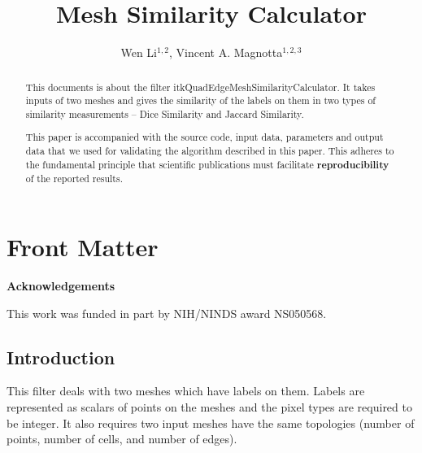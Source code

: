 \documentclass{InsightArticle}
\title{Mesh Similarity Calculator}
\author{Wen Li$^{1,2}$, Vincent A. Magnotta$^{1,2,3}$}
\makeatletter
\newcommand\ackname{Acknowledgements}
\newenvironment{acknowledgements}{%
      \titlepage
      \null\vfil
      \@beginparpenalty\@lowpenalty
      \begin{center}%
        \bfseries \ackname
        \@endparpenalty\@M
      \end{center}}%
     {\par\vfil\null\endtitlepage}
\newenvironment{acknowledgements}{%
      \if@twocolumn
        \section*{\abstractname}%
      \else
        \small
        \begin{center}%
          {\bfseries \ackname\vspace{-.5em}\vspace{\z@}}%
        \end{center}%
        \quotation
      \fi}
      {\if@twocolumn\else\endquotation\fi}
\newcommand{\IJhandlerIDnumber}{3117}
\makeatother
\begin{document}
%
% 
\IJhandlefooter{\IJhandlerIDnumber}


\ifpdf
\else
\fi


\maketitle


\ifhtml
\chapter*{Front Matter\label{front}}
\fi


\begin{abstract}
 
This documents is about the filter itkQuadEdgeMeshSimilarityCalculator. It takes 
inputs of two meshes and gives the similarity of the labels on them in two types of
similarity measurements -- Dice Similarity and Jaccard Similarity.

This paper is accompanied with the source code, input data, parameters and
output data that we used for validating the algorithm described in this paper.
This adheres to the fundamental principle that scientific publications must
facilitate \textbf{reproducibility} of the reported results.
\end{abstract}

\begin{acknowledgements}
This work was funded in part by NIH/NINDS award NS050568.
\end{acknowledgements}

\tableofcontents

\section{Introduction}
This filter deals with two meshes which have labels on them. Labels are represented as 
scalars of points on the meshes and the pixel types are required to be integer. It also 
requires two input meshes have the same topologies (number of points, number of cells,
and number of edges). 
\end{document}
